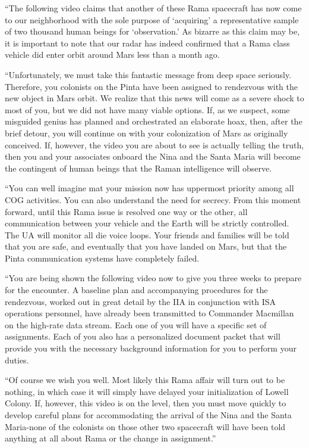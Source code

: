 \documentclass[]{article}
\begin{document}
{“The following video claims that another of these Rama spacecraft has now come to our neighborhood with the sole purpose of ‘acquiring’ a representative sample of two thousand human beings for ‘observation.’ As bizarre as this claim may be, it is important to note that our radar has indeed confirmed that a Rama class vehicle did enter orbit around Mars less than a month ago.

“Unfortunately, we must take this fantastic message from deep space seriously.  Therefore, you colonists on the Pinta have been assigned to rendezvous with the new object in Mars orbit.  We realize that this news will come as a severe shock to most of you, but we did not have many viable options.  If, as we suspect, some misguided genius has planned and orchestrated an elaborate hoax, then, after the brief detour, you will continue on with your colonization of Mars as originally conceived.  If, however, the video you are about to see is actually telling the truth, then you and your associates onboard the Nina and the Santa Maria will become the contingent of human beings that the Raman intelligence will observe.

“You can well imagine mat your mission now has uppermost priority among all COG activities.  You can also understand the need for secrecy.  From this moment forward, until this Rama issue is resolved one way or the other, all communication between your vehicle and the Earth will be strictly controlled.  The UA will monitor all die voice loops.  Your friends and families will be told that you are safe, and eventually that you have landed on Mars, but that the Pinta communication systems have completely failed.

“You are being shown the following video now to give you three weeks to prepare for the encounter.  A baseline plan and accompanying procedures for the rendezvous, worked out in great detail by the IIA in conjunction with ISA operations personnel, have already been transmitted to Commander Macmillan on the high-rate data stream.  Each one of you will have a specific set of assignments.  Each of you also has a personalized document packet that will provide you with the necessary background information for you to perform your duties.

“Of course we wish you well.  Most likely this Rama affair will turn out to be nothing, in which case it will simply have delayed your initialization of Lowell Colony.  If, however, this video is on the level, then you must move quickly to develop careful plans for accommodating the arrival of the Nina and the Santa Maria-none of the colonists on those other two spacecraft will have been told anything at all about Rama or the change in assignment.”

}
\end{document}
